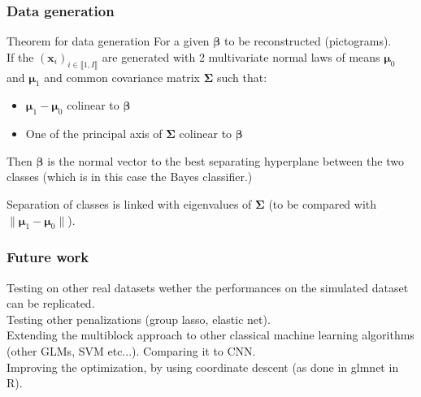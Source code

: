 \documentclass{beamer}
\begin{document}
\begin{frame}
    \frametitle{Data generation}
    \begin{block}{Theorem for data generation}
    For a given $\bm{\beta}$ to be reconstructed (pictograms).\\[5 pt]
    If the $(\mathbf{x}_i)_{i \in \llbracket 1, I\rrbracket}$ are generated with 2 multivariate normal laws of means $\bm{\mu}_0$ and $\bm{\mu}_1$ and common covariance matrix $\bm{\Sigma}$ such that:
    \begin{itemize}
        \item $\bm{\mu}_1 - \bm{\mu}_0$ colinear to $\bm{\beta}$\\[10 pt]
        \item One of the principal axis of $\bm{\Sigma}$ colinear to $\bm{\beta}$
    \end{itemize}
    \vspace{5 pt}
    Then $\bm{\beta}$ is the normal vector to the best separating hyperplane between the two classes (which is in this case the Bayes classifier.)
\end{block}
Separation of classes is linked with eigenvalues of $\bm{\Sigma}$ (to be compared with $\lVert\bm{\mu}_1 - \bm{\mu}_0 \rVert$).
\end{frame}

\begin{frame}
    \frametitle{Future work}
    Testing on other real datasets wether the performances on the simulated dataset can be replicated.\\[10 pt]
    Testing other penalizations (group lasso, elastic net).\\[10 pt]
    Extending the multiblock approach to other classical machine learning algorithms (other GLMs, SVM etc...). Comparing it to CNN.\\[10 pt]
    Improving the optimization, by using coordinate descent (as done in glmnet \cite{glmnet} in R).
\end{frame}
\end{document}
